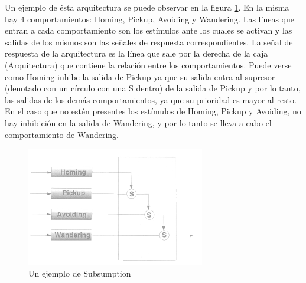 Un ejemplo de \'esta arquitectura se puede observar en la figura 
\ref{fig:subsumptionExample}. En la misma hay 4 comportamientos: Homing,
Pickup, Avoiding y Wandering. Las l\'ineas que entran a cada comportamiento son
los est\'imulos ante los cuales se activan y las salidas de los mismos son las
se\~nales de respuesta correspondientes. La se\~nal de respuesta de la
arquitectura es la l\'inea que sale por la derecha de la caja (Arquitectura)
que contiene la relaci\'on entre los comportamientos. Puede verse como Homing
inhibe la salida de Pickup ya que su salida entra al supresor (denotado con un
c\'irculo con una S dentro) de la salida de Pickup y por lo tanto, las salidas
de los dem\'as comportamientos, ya que su prioridad es mayor al resto. En el
caso que no est\'en presentes los est\'imulos de Homing, Pickup y Avoiding,
no hay inhibici\'on en la salida de Wandering, y por lo tanto se lleva a cabo
el comportamiento de Wandering.
\begin{figure}[htp]
\begin{center}
\includegraphics[scale=1.0]{comportamientos/subsumptionExample.png}
\caption{Un ejemplo de Subsumption}
\label{fig:subsumptionExample}
\end{center}
\end{figure}


\newpage


\newpage
